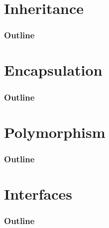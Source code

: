 \documentclass[10pt]{beamer}
\begin{document}
\section{Inheritance}
\begin{frame}
  \frametitle{Outline}
  \tableofcontents[currentsection]
\end{frame}

\section{Encapsulation}
\begin{frame}
  \frametitle{Outline}
  \tableofcontents[currentsection]
\end{frame}

\section{Polymorphism}
\begin{frame}
  \frametitle{Outline}
  \tableofcontents[currentsection]
\end{frame}

\section{Interfaces}
\begin{frame}
  \frametitle{Outline}
  \tableofcontents[currentsection]
\end{frame}
\end{document}
